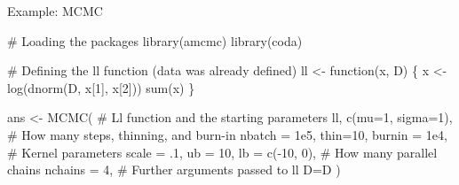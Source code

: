 \documentclass[9pt,handout,ignorenonframetext,]{beamer}
\newenvironment{Shaded}{\begin{snugshade}}{\end{snugshade}}
\newcommand{\KeywordTok}[1]{\textcolor[rgb]{0.94,0.87,0.69}{#1}}
\newcommand{\DataTypeTok}[1]{\textcolor[rgb]{0.87,0.87,0.75}{#1}}
\newcommand{\DecValTok}[1]{\textcolor[rgb]{0.86,0.86,0.80}{#1}}
\newcommand{\FloatTok}[1]{\textcolor[rgb]{0.75,0.75,0.82}{#1}}
\newcommand{\StringTok}[1]{\textcolor[rgb]{0.80,0.58,0.58}{#1}}
\newcommand{\CommentTok}[1]{\textcolor[rgb]{0.50,0.62,0.50}{#1}}
\newcommand{\ControlFlowTok}[1]{\textcolor[rgb]{0.94,0.87,0.69}{#1}}
\newcommand{\OperatorTok}[1]{\textcolor[rgb]{0.94,0.94,0.82}{#1}}
\newcommand{\NormalTok}[1]{\textcolor[rgb]{0.80,0.80,0.80}{#1}}
\begin{document}
\begin{frame}[fragile,t]{Example: MCMC}

\footnotesize

\normalsize

\footnotesize

\begin{Shaded}
\begin{Highlighting}[]
\CommentTok{# Loading the packages}
\KeywordTok{library}\NormalTok{(amcmc)}
\KeywordTok{library}\NormalTok{(coda)}

\CommentTok{# Defining the ll function (data was already defined)}
\NormalTok{ll <-}\StringTok{ }\ControlFlowTok{function}\NormalTok{(x, D) \{}
\NormalTok{  x <-}\StringTok{ }\KeywordTok{log}\NormalTok{(}\KeywordTok{dnorm}\NormalTok{(D, x[}\DecValTok{1}\NormalTok{], x[}\DecValTok{2}\NormalTok{]))}
  \KeywordTok{sum}\NormalTok{(x)}
\NormalTok{\}}

\NormalTok{ans <-}\StringTok{ }\KeywordTok{MCMC}\NormalTok{(}
  \CommentTok{# Ll function and the starting parameters}
\NormalTok{  ll, }\KeywordTok{c}\NormalTok{(}\DataTypeTok{mu=}\DecValTok{1}\NormalTok{, }\DataTypeTok{sigma=}\DecValTok{1}\NormalTok{),}
  \CommentTok{# How many steps, thinning, and burn-in}
  \DataTypeTok{nbatch =} \FloatTok{1e5}\NormalTok{, }\DataTypeTok{thin=}\DecValTok{10}\NormalTok{, }\DataTypeTok{burnin =} \FloatTok{1e4}\NormalTok{,}
  \CommentTok{# Kernel parameters}
  \DataTypeTok{scale =}\NormalTok{ .}\DecValTok{1}\NormalTok{, }\DataTypeTok{ub =} \DecValTok{10}\NormalTok{, }\DataTypeTok{lb =} \KeywordTok{c}\NormalTok{(}\OperatorTok{-}\DecValTok{10}\NormalTok{, }\DecValTok{0}\NormalTok{),}
  \CommentTok{# How many parallel chains}
  \DataTypeTok{nchains =} \DecValTok{4}\NormalTok{,}
  \CommentTok{# Further arguments passed to ll}
  \DataTypeTok{D=}\NormalTok{D}
\NormalTok{  )}
\end{Highlighting}
\end{Shaded}

\normalsize

\end{frame}
\end{document}
